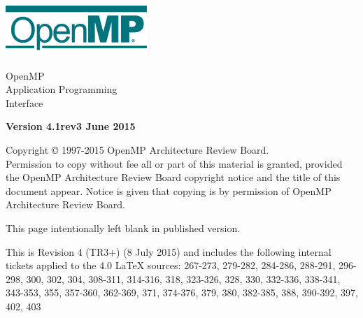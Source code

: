 
  \begin{titlepage}
    \begin{flushleft}
     \hspace{-6em} \includegraphics[width=0.4\textwidth]{openmp-logo.png}
    \end{flushleft}

    \begin{adjustwidth}{-0.75in}{0in}
    \begin{center}
      \Huge
      \textsf{OpenMP\\Application Programming\\Interface}

      \vspace{0.5in}\textsf{    }\vspace{-0.7in}
      \normalsize

      \vspace{1.0in}

      \textbf{Version 4.1rev3 June 2015}
    \end{center}
    \end{adjustwidth}

    \vspace{3.0in}

\begin{adjustwidth}{0pt}{1em}\setlength{\parskip}{0.25\baselineskip}%
Copyright © 1997-2015 OpenMP Architecture Review Board.\\
Permission to copy without fee all or part of this material is granted,
provided the OpenMP Architecture Review Board copyright notice and
the title of this document appear. Notice is given that copying is by
permission of OpenMP Architecture Review Board.\end{adjustwidth}

  \end{titlepage}


\clearpage
\thispagestyle{empty}
\phantom{a}
This page intentionally left blank in published version.

This is Revision 4 (TR3+) (8 July 2015) and includes the following 
internal tickets applied to the 4.0 LaTeX sources:
267-273, 279-282, 284-286, 288-291, 296-298, 300, 302, 304, 308-311, 
314-316, 318, 323-326, 328, 330, 332-336, 338-341, 343-353, 355, 357-360, 
362-369, 371, 374-376, 379, 380, 382-385, 388, 390-392, 397, 402, 403


\vfill

